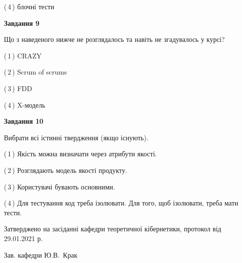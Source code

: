 \documentclass[10pt, ukrainian]{article}
\begin{document}
{\begin {large}
(\,4\,) блочні тести%


{\begin {center}\textbf{Завдання 9}\end {center}}\par
Що з наведеного нижче не розглядалось та навіть не згадувалось у курсі?\par
\vspace{2mm}



(\,1\,) CRAZY%



(\,2\,) Scrum of scrums%



(\,3\,) FDD%



(\,4\,) X-модель%


{\begin {center}\textbf{Завдання 10}\end {center}}\par
Вибрати всі істинні твердження (якщо існують).\par
\vspace{2mm}



(\,1\,) Якість можна визначати через атрибути якості.%



(\,2\,) Розглядають модель якості продукту.%



(\,3\,) Користувачі бувають основними.%



(\,4\,) Для тестування код треба ізолювати. Для того, щоб ізолювати, треба мати тести.%



\end {large}}
{\vspace{5mm}\smallskip \begin {small} Затверджено на засіданні кафедри теоретичної кібернетики, протокол  від   29.01.2021 р.\par\smallskip\smallskip
{\parbox {6.5 cm}{Зав. кафедри \dotfill Ю.В.~Крак}} \end{small}}
\newpage
\end{document}
